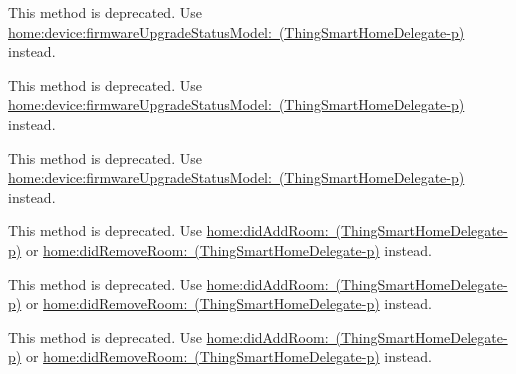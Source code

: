 \begin{DoxyRefList}
\label{deprecated__deprecated000056}%
%
This method is deprecated. Use \mbox{\hyperlink{protocol_thing_smart_home_delegate-p_ac784dc7612e4ae3881f7f0f28b75fa04}{home\+:device\+:firmware\+Upgrade\+Status\+Model\+: (\+Thing\+Smart\+Home\+Delegate-\/p)}} instead. 

\label{deprecated__deprecated000002}%
%
This method is deprecated. Use \mbox{\hyperlink{protocol_thing_smart_home_delegate-p_ac784dc7612e4ae3881f7f0f28b75fa04}{home\+:device\+:firmware\+Upgrade\+Status\+Model\+: (\+Thing\+Smart\+Home\+Delegate-\/p)}} instead. 

\label{deprecated__deprecated000038}%
%
This method is deprecated. Use \mbox{\hyperlink{protocol_thing_smart_home_delegate-p_ac784dc7612e4ae3881f7f0f28b75fa04}{home\+:device\+:firmware\+Upgrade\+Status\+Model\+: (\+Thing\+Smart\+Home\+Delegate-\/p)}} instead.  
\item[Member \mbox{\hyperlink{protocol_thing_smart_home_delegate-p_a6641abc0be5ed70fd07902418585e9c4}{\mbox{[}Thing\+Smart\+Home\+Delegate-\/p home\+Did\+Update\+Room\+Info\+:\mbox{]}}} ]\label{deprecated__deprecated000001}%
%
This method is deprecated. Use \mbox{\hyperlink{protocol_thing_smart_home_delegate-p_acbc50744a6be25877aa0cdccb4ebb424}{home\+:did\+Add\+Room\+: (\+Thing\+Smart\+Home\+Delegate-\/p)}} or \mbox{\hyperlink{protocol_thing_smart_home_delegate-p_a1fa4b13b903fa588e8386cb9d96196fc}{home\+:did\+Remove\+Room\+: (\+Thing\+Smart\+Home\+Delegate-\/p)}} instead. 

\label{deprecated__deprecated000019}%
%
This method is deprecated. Use \mbox{\hyperlink{protocol_thing_smart_home_delegate-p_acbc50744a6be25877aa0cdccb4ebb424}{home\+:did\+Add\+Room\+: (\+Thing\+Smart\+Home\+Delegate-\/p)}} or \mbox{\hyperlink{protocol_thing_smart_home_delegate-p_a1fa4b13b903fa588e8386cb9d96196fc}{home\+:did\+Remove\+Room\+: (\+Thing\+Smart\+Home\+Delegate-\/p)}} instead. 

\label{deprecated__deprecated000037}%
%
This method is deprecated. Use \mbox{\hyperlink{protocol_thing_smart_home_delegate-p_acbc50744a6be25877aa0cdccb4ebb424}{home\+:did\+Add\+Room\+: (\+Thing\+Smart\+Home\+Delegate-\/p)}} or \mbox{\hyperlink{protocol_thing_smart_home_delegate-p_a1fa4b13b903fa588e8386cb9d96196fc}{home\+:did\+Remove\+Room\+: (\+Thing\+Smart\+Home\+Delegate-\/p)}} instead. 


\end{DoxyRefList}

